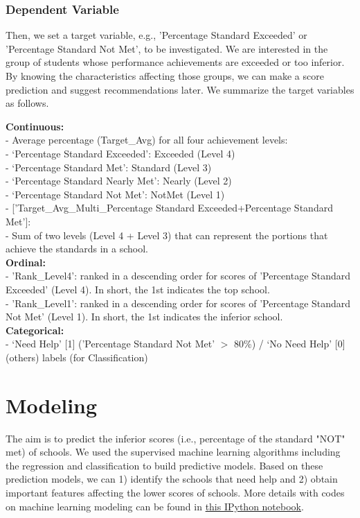 \documentclass[11pt]{article}
\begin{document}
\subsubsection{Dependent Variable}
Then, we set a target variable, e.g., 'Percentage Standard Exceeded' or 'Percentage Standard Not Met', to be investigated. We are interested in the group of students whose performance achievements are exceeded or too inferior. By knowing the characteristics affecting those groups, we can make a score prediction and suggest recommendations later.
We summarize the target variables as follows.

\noindent \textbf{Continuous:}\\
- Average percentage (Target\_Avg) for all four achievement levels:\\
\indent - `Percentage Standard Exceeded': Exceeded (Level 4)\\
\indent    - `Percentage Standard Met': Standard (Level 3)\\
\indent    - `Percentage Standard Nearly Met': Nearly (Level 2)\\
\indent    - `Percentage Standard Not Met': NotMet (Level 1) \\ 
- ['Target\_Avg\_Multi\_Percentage Standard Exceeded+Percentage Standard Met']:\\
\indent   - Sum of two levels (Level 4 + Level 3) that can represent the portions that achieve the standards in a school.\\
%
\textbf{Ordinal:}\\
- 'Rank\_Level4': ranked in a descending order for scores of 'Percentage Standard Exceeded' (Level 4). In short, the 1st indicates the top school.\\
- 'Rank\_Level1': ranked in a descending order for scores of 'Percentage Standard Not Met' (Level 
1). In short, the 1st indicates the inferior school.\\
%
\textbf{Categorical:}\\
- `Need Help' [1] ('Percentage Standard Not Met' $>$ 80\%) / `No Need Help' [0] (others) labels (for Classification)

\section{Modeling}
\label{Modeling}

The aim is to predict the inferior scores (i.e., percentage of the standard "NOT" met) of schools. 
We used the supervised machine learning  algorithms including the regression and classification to build predictive models.
%
Based on these prediction models, we can 1) identify the schools that need help and 2) obtain important features affecting the lower scores of schools. 
%
More details with codes on machine learning modeling can be found in
\href{https://github.com/ahrimhan/data-science-project/blob/master/project1/machine_learning.ipynb}{this IPython notebook}. 
\end{document}
